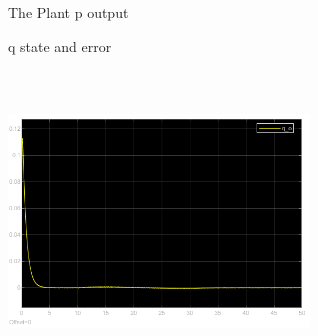 \documentclass[12pt, a4paper]{article}
\begin{document}
\begin{enumerate}[1.]
\begin{figure}[H]
    \caption{The Plant p output}
    \label{fig:label}
    \end{figure}
\begin{figure}[H]
        \centering
        \qquad
        \caption{q state and error}
        \label{fig:example}%
    \end{figure}
\begin{figure}[H]
    \centering
    \includegraphics[width=8cm,height=8cm,scale=0.6]{q_o.png}

\end{figure}
\end{enumerate}
\end{document}
